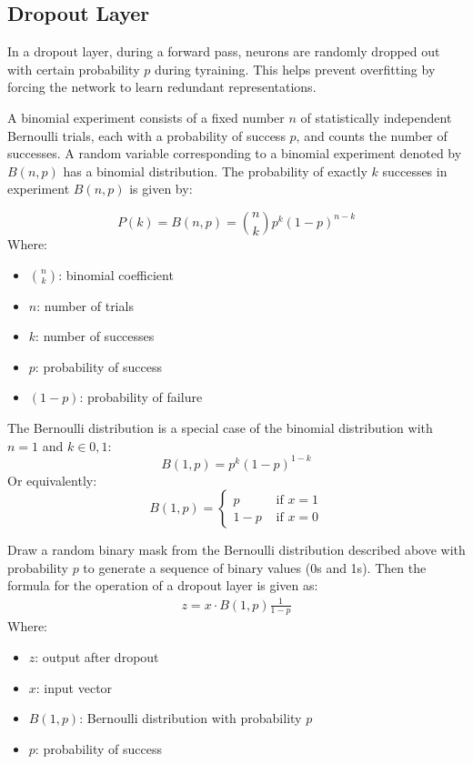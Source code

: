 \documentclass[a4paper]{article}
\begin{document}
\subsection*{Dropout Layer}
In a dropout layer, during a forward pass, neurons are randomly dropped out with certain probability $p$ during tyraining. This helps prevent overfitting by forcing the network to learn redundant representations.

A binomial experiment consists of a fixed number $n$ of statistically independent Bernoulli trials, each with a probability of success $p$, and counts the number of successes. A random variable corresponding to a binomial experiment denoted by $B(n,p)$ has a binomial distribution. The probability of exactly $k$ successes in experiment $B(n,p)$ is given by:

\begin{equation*}
    P(k) = B(n,p) = \binom{n}{k} p^k (1-p)^{n-k}
\end{equation*}
Where:
\begin{itemize}
    \item $\binom{n}{k}$: binomial coefficient
    \item $n$: number of trials
    \item $k$: number of successes
    \item $p$: probability of success
    \item $(1-p)$: probability of failure
\end{itemize}

The Bernoulli distribution is a special case of the binomial distribution with $n=1$ and $k \in {0,1}$:
\begin{equation*}
    B(1,p) = p^k (1-p)^{1-k}
\end{equation*}
Or equivalently:
\begin{equation*}
    B(1,p) = \begin{cases}
        p   & \text{ if } x=1\\
        1-p & \text{ if } x=0
    \end{cases}
\end{equation*}

Draw a random binary mask from the Bernoulli distribution described above with probability $p$ to generate a sequence of binary values (0s and 1s). Then the formula for the operation of a dropout layer is given as:
\begin{align*}
    z = x \cdot B(1,p) \frac{1}{1-p}
\end{align*}
Where:
\begin{itemize}
    \item $z$: output after dropout
    \item $x$: input vector
    \item $B(1,p)$: Bernoulli distribution with probability $p$
    \item $p$: probability of success
\end{itemize}
\end{document}
